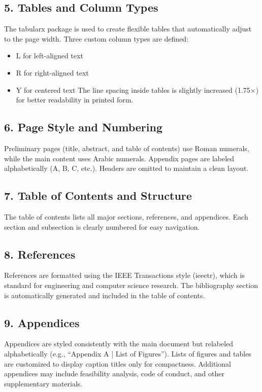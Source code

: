 \subsection*{5. Tables and Column Types}
The tabularx package is used to create flexible tables that automatically adjust to the page width. Three custom column types are defined:
\begin{itemize}
    \item
    L for left-aligned text
    \item
    R for right-aligned text
    \item
    Y for centered text
    The line spacing inside tables is slightly increased (1.75×) for better readability in printed form.
    \end{itemize}
\subsection*{6. Page Style and Numbering}
Preliminary pages (title, abstract, and table of contents) use Roman numerals, while the main content uses Arabic numerals. Appendix pages are labeled alphabetically (A, B, C, etc.). Headers are omitted to maintain a clean layout.
\subsection*{7. Table of Contents and Structure}
The table of contents lists all major sections, references, and appendices. Each section and subsection is clearly numbered for easy navigation.
\subsection*{8. References}
References are formatted using the IEEE Transactions style (ieeetr), which is standard for engineering and computer science research. The bibliography section is automatically generated and included in the table of contents.
\subsection*{9. Appendices}
Appendices are styled consistently with the main document but relabeled alphabetically (e.g., “Appendix A | List of Figures”). Lists of figures and tables are customized to display caption titles only for compactness. Additional appendices may include feasibility analysis, code of conduct, and other supplementary materials.

